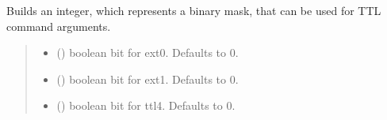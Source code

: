 \documentclass[letterpaper,10pt,english]{sphinxmanual}
\begin{document}
\begin{fulllineitems}
\begin{fulllineitems}
\label{\detokenize{Morelia.Devices:Morelia.Devices.PodDevice_8401HR.Pod8401HR.GetTTLbitmask}}
\pysigstartsignatures
{}
\pysigstopsignatures
\sphinxAtStartPar
Builds an integer, which represents a binary mask, that can be used for TTL command arguments.
\begin{quote}\begin{description}
\begin{itemize}
\item {} 
\sphinxAtStartPar
{} (\sphinxstyleliteralemphasis{\sphinxupquote{, }}) \textendash{} boolean bit for ext0. Defaults to 0.

\item {} 
\sphinxAtStartPar
{} (\sphinxstyleliteralemphasis{\sphinxupquote{, }}) \textendash{} boolean bit for ext1. Defaults to 0.

\item {} 
\sphinxAtStartPar
{} (\sphinxstyleliteralemphasis{\sphinxupquote{, }}) \textendash{} boolean bit for ttl4. Defaults to 0.


\end{itemize}
\end{description}
\end{quote}
\end{fulllineitems}
\end{fulllineitems}
\end{document}
